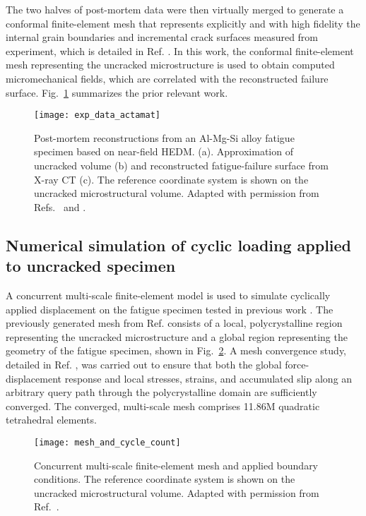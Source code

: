 The two halves of post-mortem data were then virtually merged to generate a conformal finite-element mesh that represents explicitly and with high fidelity the internal grain boundaries and incremental crack surfaces measured from experiment, which is detailed in Ref. \cite{spear2016}. In this work, the conformal finite-element mesh representing the uncracked microstructure is used to obtain computed micromechanical fields, which are correlated with the reconstructed failure surface. Fig.~\ref{fig:exp_data_actamat} summarizes the prior relevant work.
\begin{figure}[b]
  \centering
    \texttt{[image: exp\_data\_actamat]}
    \caption{Post-mortem reconstructions from an Al-Mg-Si alloy fatigue specimen based on near-field HEDM. (a). Approximation of uncracked volume (b) and reconstructed fatigue-failure surface from X-ray CT (c). The reference coordinate system is shown on the uncracked microstructural volume. Adapted with permission from Refs.\ \cite{spear2016} and \cite{spear2014}.}
    \label{fig:exp_data_actamat}
\end{figure}

\subsection{Numerical simulation of cyclic loading applied to uncracked specimen} \label{simulation}
A concurrent multi-scale finite-element model is used to simulate cyclically applied displacement on the fatigue specimen tested in previous work \cite{spear2016}. The previously generated mesh from Ref. \cite{spear2016} consists of a local, polycrystalline region representing the uncracked microstructure and a global region representing the geometry of the fatigue specimen, shown in Fig.~\ref{fig:mesh_and_cycle_count}. A mesh convergence study, detailed in Ref. \cite{spear2014numerical}, was carried out to ensure that both the global force-displacement response and local stresses, strains, and accumulated slip along an arbitrary query path through the polycrystalline domain are sufficiently converged. The converged, multi-scale mesh comprises 11.86M quadratic tetrahedral elements.
\begin{figure}[b]
  \centering
    \texttt{[image: mesh\_and\_cycle\_count]}
    \caption{Concurrent multi-scale finite-element mesh and applied boundary conditions. The reference coordinate system is shown on the uncracked microstructural volume. Adapted with permission from Ref.\ \cite{spear2016}.}
    \label{fig:mesh_and_cycle_count}
\end{figure}


